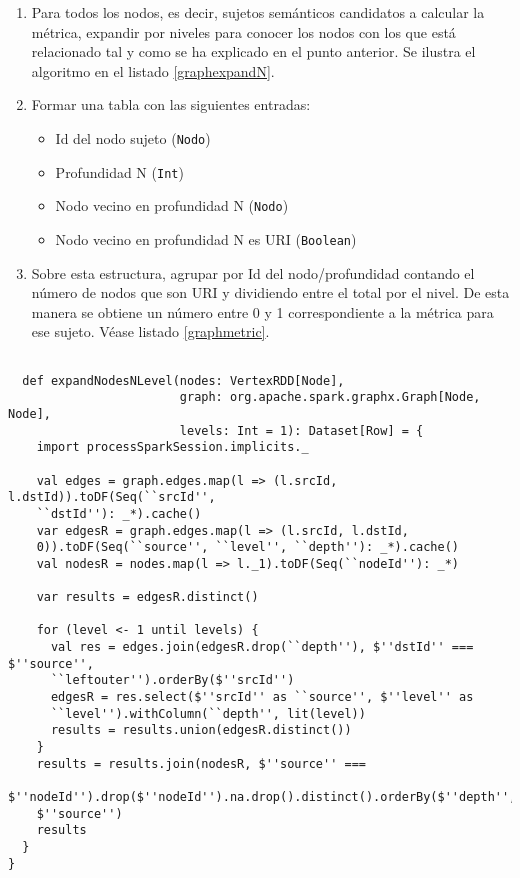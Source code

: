 \begin{enumerate}
\item Para todos los nodos, es decir, sujetos semánticos candidatos a calcular
  la métrica, expandir por niveles para conocer los nodos con los que está
  relacionado tal y como se ha explicado en el punto anterior. Se ilustra el
  algoritmo en el listado \ref{graphexpandN}. 

\item Formar una tabla con las siguientes entradas: 
  \begin{itemize}
  \item Id del nodo sujeto (\texttt{Nodo})
  \item Profundidad N (\texttt{Int})
  \item Nodo vecino en profundidad N (\texttt{Nodo})
  \item Nodo vecino en profundidad N es URI (\texttt{Boolean})
  \end{itemize}
\item Sobre esta estructura, agrupar por Id del nodo/profundidad contando el
  número de nodos que son URI y dividiendo entre el total por el nivel. De esta
  manera se obtiene un número entre 0 y 1 correspondiente a la métrica para ese
  sujeto. Véase listado \ref{graphmetric}.
\end{enumerate}

\lstset{escapechar=@,language=scala}
\begin{lstlisting}[caption={Expansión de nodos en N niveles para un conjunto de
      sujetos},captionpos=b, label=graphexpandN]

  def expandNodesNLevel(nodes: VertexRDD[Node],
                        graph: org.apache.spark.graphx.Graph[Node, Node],
                        levels: Int = 1): Dataset[Row] = {
    import processSparkSession.implicits._

    val edges = graph.edges.map(l => (l.srcId, l.dstId)).toDF(Seq(``srcId'',
    ``dstId''): _*).cache()
    var edgesR = graph.edges.map(l => (l.srcId, l.dstId,
    0)).toDF(Seq(``source'', ``level'', ``depth''): _*).cache()
    val nodesR = nodes.map(l => l._1).toDF(Seq(``nodeId''): _*)

    var results = edgesR.distinct()

    for (level <- 1 until levels) {
      val res = edges.join(edgesR.drop(``depth''), $''dstId'' === $''source'',
      ``leftouter'').orderBy($''srcId'')
      edgesR = res.select($''srcId'' as ``source'', $''level'' as
      ``level'').withColumn(``depth'', lit(level))
      results = results.union(edgesR.distinct())
    }
    results = results.join(nodesR, $''source'' ===
    $''nodeId'').drop($''nodeId'').na.drop().distinct().orderBy($''depth'',
    $''source'')
    results
  }
}

\end{lstlisting}

